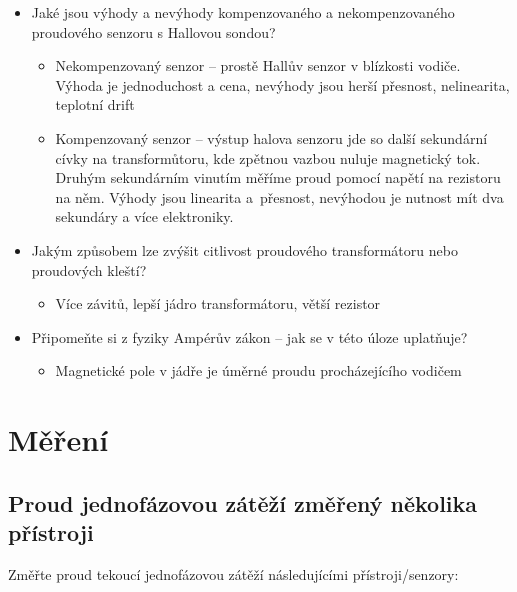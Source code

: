 \documentclass[a4paper,12pt]{article}
\begin{document}
\begin{itemize}
  \item Jaké jsou výhody a nevýhody kompenzovaného a nekompenzovaného proudového senzoru s Hallovou sondou?
    \begin{itemize}
      \item Nekompenzovaný senzor -- prostě Hallův senzor v blízkosti vodiče. Výhoda je jednoduchost a cena, nevýhody jsou herší přesnost, nelinearita, teplotní drift
      \item Kompenzovaný senzor -- výstup halova senzoru jde so další sekundární cívky na transformůtoru, kde zpětnou vazbou nuluje magnetický tok. Druhým sekundárním vinutím měříme proud pomocí napětí na rezistoru na něm. Výhody jsou linearita a~přesnost, nevýhodou je nutnost mít dva sekundáry a více elektroniky.
    \end{itemize}
  \item Jakým způsobem lze zvýšit citlivost proudového transformátoru nebo proudových kleští?
    \begin{itemize}
      \item Více závitů, lepší jádro transformátoru, větší rezistor
    \end{itemize}
  \item Připomeňte si z fyziky Ampérův zákon – jak se v této úloze uplatňuje?
    \begin{itemize}
      \item Magnetické pole v jádře je úměrné proudu procházejícího vodičem
    \end{itemize}
\end{itemize}

\section{Měření}
\subsection{Proud jednofázovou zátěží změřený několika přístroji}
Změřte proud tekoucí jednofázovou zátěží následujícími přístroji/senzory:
\end{document}
